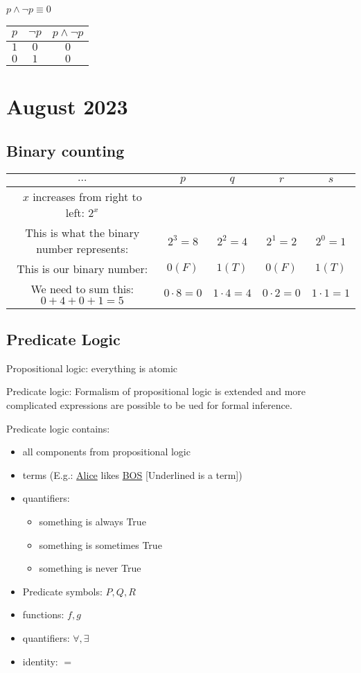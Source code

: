 \documentclass{article}
\let\stdsection\section
\renewcommand\section{\newpage\stdsection}
\begin{document}
$p \wedge \neg p \equiv 0$ \\
\begin{tabular}{cc|c}
  $p$ & $\neg p$ & $p \wedge \neg p$ \\ \hline
  $1$ & $0$ & $0$ \\
  $0$ & $1$ & $0$ \\
\end{tabular}


\section{ August 2023}

\subsection{Binary counting}

\begin{tabular}{|c|c|c|c|c|}
  \hline
  $\dots$ & $p$ & $q$ & $r$ & $s$ \\ \hline
  $x$ increases from right to left: $2^{x}$ & & & & \\
  This is what the binary number represents: & $2^3 = 8$ & $2^2 = 4$ & $2^1 = 2$ & $2^0 = 1$ \\ \hline
  This is our binary number: & $0 \left( F \right)$ & $1 \left( T \right)$ & $0 \left( F \right)$ & $1 \left( T \right)$ \\ \hline
  We need to sum this: $0 + 4 + 0 + 1 = 5$ & $0 \cdot 8 = 0$ & $1 \cdot 4 = 4$ & $0 \cdot 2 = 0$ & $1 \cdot 1 = 1$ \\ \hline
\end{tabular} \vspace{.5cm}


\subsection{Predicate Logic}

Propositional logic: everything is atomic

Predicate logic: Formalism of propositional logic is extended and more complicated expressions are possible to be ued for formal inference.

Predicate logic contains:

\begin{itemize}
  \item all components from propositional logic
  \item terms (E.g.: \underline{Alice} likes \underline{BOS} [Underlined is a term])
  \item quantifiers:
  \begin{itemize}
    \item something is always True
    \item something is sometimes True
    \item something is never True
  \end{itemize}
  \item Predicate symbols: $P, Q, R$
  \item functions: $f, g$
  \item quantifiers: $\forall, \exists$
  \item identity: $=$
\end{itemize}
\end{document}
